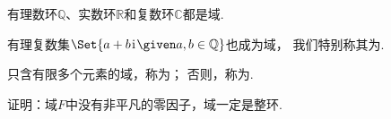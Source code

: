 有理数环\(\mathbb{Q}\)、实数环\(\mathbb{R}\)和复数环\(\mathbb{C}\)都是域.

有理复数集\(\Set{ a+b\iu \given a,b\in\mathbb{Q} }\)也成为域，
我们特别称其为.

只含有限多个元素的域，称为；
否则，称为.

\begin{example}
证明：域\(F\)中没有非平凡的零因子，域一定是整环.
\end{example}
